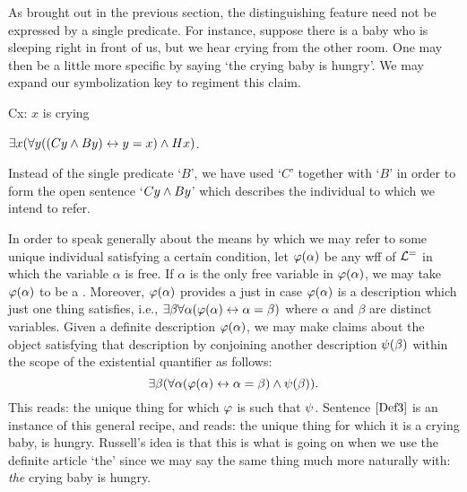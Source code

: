As brought out in the previous section, the distinguishing feature need not be expressed by a single predicate.
For instance, suppose there is a baby who is sleeping right in front of us, but we hear crying from the other room.
One may then be a little more specific by saying `the crying baby is hungry'.
We may expand our symbolization key to regiment this claim.

\begin{multicols}{2}

\begin{ekey}
  \item[Cx:] $x$ is crying
\end{ekey}

\begin{earg}
  \item[\ex{Def3}] $\exists x (\forall y ((Cy \wedge By) \leftrightarrow y = x) \wedge Hx)$.
\end{earg}

\end{multicols}

Instead of the single predicate `$B$', we have used `$C$' together with `$B$' in order to form the open sentence `$Cy \wedge By$' which describes the individual to which we intend to refer.

In order to speak generally about the means by which we may refer to some unique individual satisfying a certain condition, let $\varphi(\alpha)$ be any wff of $\mathcal{L}^{=}$ in which the variable $\alpha$ is free. 
If $\alpha$ is the only free variable in $\varphi(\alpha)$, we may take $\varphi(\alpha)$ to be a .
Moreover, $\varphi(\alpha)$ provides a  just in case $\varphi(\alpha)$ is a description which just one thing satisfies, i.e., $\exists \beta\forall \alpha(\varphi(\alpha)\leftrightarrow \alpha = \beta)$ where $\alpha$ and $\beta$ are distinct variables.
Given a definite description $\varphi(\alpha)$, we may make claims about the object satisfying that description by conjoining another description $\psi(\beta)$ within the scope of the existential quantifier as follows: 
  $$\exists \beta(\forall \alpha(\varphi(\alpha)\leftrightarrow \alpha = \beta) \wedge \psi(\beta)).$$
This reads: the unique thing for which $\varphi$ is such that $\psi$.
Sentence $\ref{Def3}$ is an instance of this general recipe, and reads: the unique thing for which it is a crying baby, is hungry. 
Russell's idea is that this is what is going on when we use the definite article `the' since we may say the same thing much more naturally with: \textit{the} crying baby is hungry.

